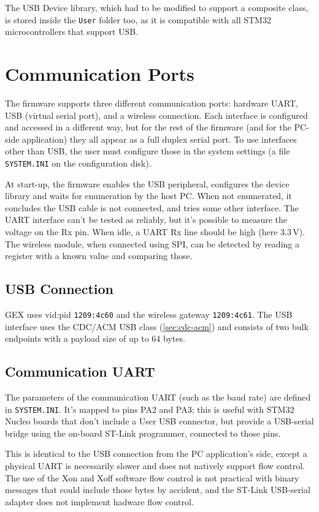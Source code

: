 The USB Device library, which had to be modified to support a composite class, is stored inside the \verb|User| folder too, as it is compatible with all STM32 microcontrollers that support USB.


\section{Communication Ports} \label{sec:com-ports}

The firmware supports three different communication ports: hardware UART, USB (virtual serial port), and a wireless connection. Each interface is configured and accessed in a different way, but for the rest of the firmware (and for the PC-side application) they all appear as a full duplex serial port. To use interfaces other than USB, the user must configure those in the system settings (a file \verb|SYSTEM.INI| on the configuration disk).

At start-up, the firmware enables the USB peripheral, configures the device library and waits for enumeration by the host PC. When not enumerated, it concludes the USB cable is not connected, and tries some other interface. The UART interface can't be tested as reliably, but it's possible to measure the voltage on the Rx pin. When idle, a UART Rx line should be high (here 3.3\,V). The wireless module, when connected using SPI, can be detected by reading a register with a known value and comparing those.

\subsection{USB Connection}

GEX uses vid:pid \verb|1209:4c60| and the wireless gateway \verb|1209:4c61|. The USB interface uses the CDC/ACM USB class (\ref{sec:cdc-acm}) and consists of two bulk endpoints with a payload size of up to 64 bytes.

\subsection{Communication UART}

The parameters of the communication UART (such as the baud rate) are defined in \verb|SYSTEM.INI|. It's mapped to pins PA2 and PA3; this is useful with STM32 Nucleo boards that don't include a User USB connector, but provide a USB-serial bridge using the on-board ST-Link programmer, connected to those pins. 

This is identical to the USB connection from the PC application's side, except a physical UART is necessarily slower and does not natively support flow control. The use of the Xon and Xoff software flow control is not practical with binary messages that could include those bytes by accident, and the ST-Link USB-serial adapter does not implement hadware flow control.

